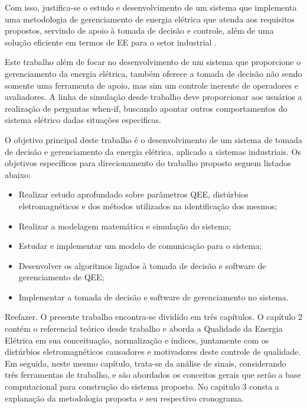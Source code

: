 \par
Com isso, justifica-se o estudo e desenvolvimento de um sistema que implementa uma metodologia de gerenciamento de energia elétrica que atenda aos requisitos propostos, servindo de apoio à tomada de decisão e controle, além de uma solução eficiente em termos de EE para o setor industrial \cite{GAR09}.
\par
Este trabalho além de focar no desenvolvimento de um sistema que proporcione o gerenciamento da energia elétrica, também oferece a tomada de decisão não sendo somente uma ferramenta de apoio, mas sim um controle inerente de operadores e avaliadores. A linha de simulação desde trabalho deve proporcionar aos usuários a realização de perguntas when-if, buscando apontar outros comportamentos do sistema elétrico dadas situações especificas.
\par
O objetivo principal deste trabalho é o desenvolvimento de um sistema de tomada de decisão e gerenciamento da energia elétrica, aplicado a sistemas industriais. Os objetivos específicos para direcionamento do trabalho proposto seguem listados abaixo:
\begin{itemize}
	\item Realizar estudo aprofundado sobre parâmetros QEE, distúrbios eletromagnéticos e dos métodos utilizados na identificação dos mesmos;
	\item Realizar a modelagem matemática e simulação do sistema;
	\item Estudar e implementar  um modelo de comunicação para o sistema;
	\item Desenvolver os algoritmos ligados à tomada de decisão e software de gerenciamento de QEE;
	\item Implementar a tomada de decisão e software de gerenciamento no sistema.
\end{itemize}
\par
\color{red}Reefazer.
O presente trabalho encontra-se dividido em três capítulos. O capítulo 2 contém o referencial teórico desde trabalho e aborda a Qualidade da Energia Elétrica em sua conceituação, normalização e índices, juntamente com os distúrbios eletromagnéticos causadores e motivadores deste controle de qualidade. Em seguida, neste mesmo capítulo, trata-se da análise de sinais, considerando três ferramentas de trabalho, e são abordados os conceitos gerais que serão a base computacional para construção do sistema proposto. No capitulo 3 consta a explanação da metodologia proposta e seu respectivo cronograma.
\color{black}
